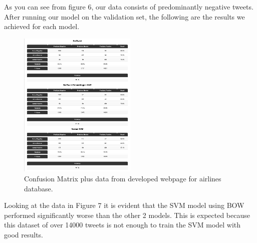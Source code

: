 \documentclass[conference]{IEEEtran}
\begin{document}
As you can see from figure 6, our data consists of predominantly negative tweets. After running our model on the validation set, the following are the results we achieved for each model.

\begin{figure}[b!]
    \includegraphics[width=0.5\textwidth]{results.png}
    \caption{Confusion Matrix plus data from developed webpage for airlines database.}
\end{figure}

Looking at the data in Figure 7 it is evident that the SVM model using BOW performed significantly worse than the other 2 models. This is expected because this dataset of over 14000 tweets is not enough to train the SVM model with good results. 
\end{document}
